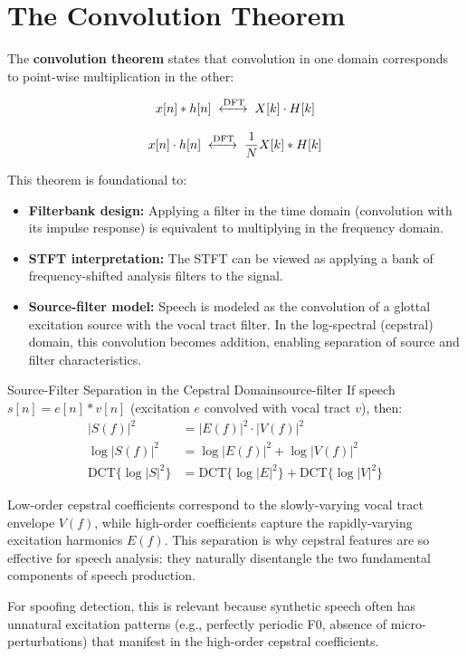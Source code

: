 \documentclass[12pt]{report}
\begin{document}
\section{The Convolution Theorem}

The \textbf{convolution theorem} states that convolution in one domain corresponds to
point-wise multiplication in the other:

\begin{equation}
    x[n] * h[n] \;\xleftrightarrow{\text{DFT}}\; X[k] \cdot H[k]
\end{equation}

\begin{equation}
    x[n] \cdot h[n] \;\xleftrightarrow{\text{DFT}}\; \frac{1}{N} X[k] * H[k]
\end{equation}

This theorem is foundational to:
\begin{itemize}
    \item \textbf{Filterbank design:} Applying a filter in the time domain (convolution with
          its impulse response) is equivalent to multiplying in the frequency domain.
    \item \textbf{STFT interpretation:} The STFT can be viewed as applying a bank of
          frequency-shifted analysis filters to the signal.
    \item \textbf{Source-filter model:} Speech is modeled as the convolution of a glottal
          excitation source with the vocal tract filter. In the log-spectral (cepstral) domain,
          this convolution becomes addition, enabling separation of source and filter
          characteristics.
\end{itemize}

\begin{thmbox}{Source-Filter Separation in the Cepstral Domain}{source-filter}
    If speech $s[n] = e[n] * v[n]$ (excitation $e$ convolved with vocal tract $v$), then:
    \begin{align}
        |S(f)|^2 &= |E(f)|^2 \cdot |V(f)|^2 \\
        \log|S(f)|^2 &= \log|E(f)|^2 + \log|V(f)|^2 \\
        \text{DCT}\{\log|S|^2\} &= \text{DCT}\{\log|E|^2\} + \text{DCT}\{\log|V|^2\}
    \end{align}

    Low-order cepstral coefficients correspond to the slowly-varying vocal tract envelope
    $V(f)$, while high-order coefficients capture the rapidly-varying excitation harmonics
    $E(f)$. This separation is why cepstral features are so effective for speech analysis:
    they naturally disentangle the two fundamental components of speech production.

    For spoofing detection, this is relevant because synthetic speech often has unnatural
    excitation patterns (e.g., perfectly periodic F0, absence of micro-perturbations) that
    manifest in the high-order cepstral coefficients.
\end{thmbox}
\end{document}

